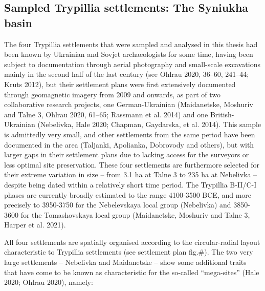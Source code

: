 \documentclass[
  12pt,
  a4paper, twoside]{book}
\begin{document}
\hypertarget{sampled-trypillia-settlements-the-syniukha-basin}{%
\subsection{Sampled Trypillia settlements: The Syniukha basin}\label{sampled-trypillia-settlements-the-syniukha-basin}}

The four Trypillia settlements that were sampled and analysed in this thesis had been known by Ukrainian and Sovjet archaeologists for some time, having been subject to documentation through aerial photography and small-scale excavations mainly in the second half of the last century (see Ohlrau 2020, 36--60, 241--44; Kruts 2012), but their settlement plans were first extensively documented through geomagnetic imagery from 2009 and onwards, as part of two collaborative research projects, one German-Ukrainian (Maidanetske, Moshuriv and Talne 3, Ohlrau 2020, 61--65; Rassmann et al. 2014) and one British-Ukrainian (Nebelivka, Hale 2020; Chapman, Gaydarska, et al. 2014). This sample is admittedly very small, and other settlements from the same period have been documented in the area (Taljanki, Apolianka, Dobrovody and others), but with larger gaps in their settlement plans due to lacking access for the surveyors or less optimal site preservation. These four settlements are furthermore selected for their extreme variation in size -- from 3.1 ha at Talne 3 to 235 ha at Nebelivka -- despite being dated within a relatively short time period. The Trypillia B-II/C-I phases are currently broadly estimated to the range 4100-3500 BCE, and more precisely to 3950-3750 for the Nebelevskaya local group (Nebelivka) and 3850-3600 for the Tomashovskaya local group (Maidanetske, Moshuriv and Talne 3, Harper et al. 2021).

All four settlements are spatially organised according to the circular-radial layout characteristic to Trypillia settlements (see settlement plan fig.\#). The two very large settlements -- Nebelivka and Maidanetske -- show some additional traits that have come to be known as characteristic for the so-called ``mega-sites'' (Hale 2020; Ohlrau 2020), namely:
\end{document}
